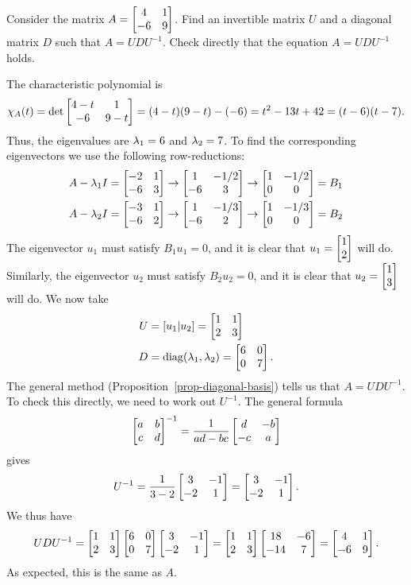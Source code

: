 \documentclass[a4paper]{amsart}
\renewenvironment{solution}{\SolutionInline}{\endSolutionInline}
\begin{document}
\begin{exercise}\label{ex-diagonal-i}
 Consider the matrix $A=\left[\begin{matrix} 4&1\\ -6&9\end{matrix}\right]$.  Find an invertible 
 matrix $U$ and a diagonal matrix $D$ such that $A=UDU^{-1}$.  Check
 directly that the equation $A=UDU^{-1}$ holds.
\end{exercise}
\begin{solution}
 The characteristic polynomial is
 \[ \chi_A(t)
      = \det\left[\begin{matrix} 4-t & 1 \\ -6 & 9-t \end{matrix}\right] 
      = (4-t)(9-t) - (-6) = t^2 -13t +42 = (t-6)(t-7).
 \]
 Thus, the eigenvalues are $\lambda_1=6$ and $\lambda_2=7$.  To find the
 corresponding eigenvectors we use the following row-reductions:
 \begin{align*}
  A-\lambda_1I &= \left[\begin{matrix} -2&1 \\ -6&3 \end{matrix}\right] 
            \to \left[\begin{matrix} 1&-1/2 \\ -6&3 \end{matrix}\right] 
            \to \left[\begin{matrix} 1&-1/2 \\ 0&0 \end{matrix}\right] 
            = B_1 \\
  A-\lambda_2I &= \left[\begin{matrix} -3&1 \\ -6&2 \end{matrix}\right] 
            \to \left[\begin{matrix} 1&-1/3 \\ -6&2 \end{matrix}\right] 
            \to \left[\begin{matrix} 1&-1/3 \\ 0&0 \end{matrix}\right] 
            = B_2
 \end{align*}
 The eigenvector $u_1$ must satisfy $B_1u_1=0$, and it is clear that
 $u_1=\left[\begin{matrix} 1\\2\end{matrix}\right]$ will do.   Similarly, the eigenvector $u_2$ must
 satisfy $B_2u_2=0$, and it is clear that $u_2=\left[\begin{matrix} 1\\3\end{matrix}\right]$ will do.
 We now take
 \begin{align*}
  U &= [u_1|u_2] = \left[\begin{matrix} 1 & 1 \\ 2 & 3 \end{matrix}\right] \\
  D &= \operatorname{diag}(\lambda_1,\lambda_2) = \left[\begin{matrix} 6 & 0 \\ 0 & 7 \end{matrix}\right].
 \end{align*}
 The general method (Proposition~\ref{prop-diagonal-basis}) tells us
 that $A=UDU^{-1}$.  To check this directly, we need to work out
 $U^{-1}$.  The general formula
 \[ \left[\begin{matrix} a&b\\ c&d\end{matrix}\right]^{-1} = \frac{1}{ad-bc}\left[\begin{matrix} d&-b \\-c&a\end{matrix}\right] \]
 gives 
 \[ U^{-1}=\frac{1}{3-2}\left[\begin{matrix} 3&-1\\-2&1\end{matrix}\right] = \left[\begin{matrix} 3&-1\\-2&1\end{matrix}\right]. \]
 We thus have
 \[ UDU^{-1} = 
     \left[\begin{matrix} 1 & 1 \\ 2 & 3 \end{matrix}\right]
     \left[\begin{matrix} 6 & 0 \\ 0 & 7 \end{matrix}\right]
     \left[\begin{matrix} 3 & -1\\ -2 & 1 \end{matrix}\right] =
     \left[\begin{matrix} 1 & 1 \\ 2 & 3 \end{matrix}\right]
     \left[\begin{matrix} 18 & -6 \\ -14 & 7 \end{matrix}\right] =
     \left[\begin{matrix} 4 & 1 \\ -6 & 9 \end{matrix}\right].
 \]
 As expected, this is the same as $A$.
\end{solution}
\end{document}
